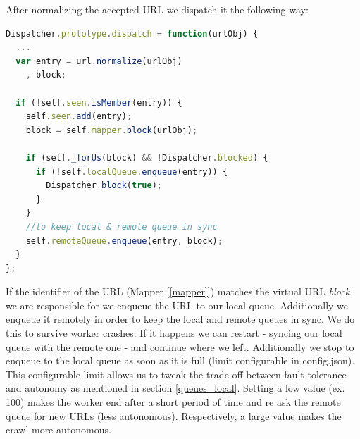 After normalizing the accepted URL we dispatch it the following way:

\begin{lstlisting}[language=JavaScript]
Dispatcher.prototype.dispatch = function(urlObj) {
  ...
  var entry = url.normalize(urlObj)
    , block;
  
  if (!self.seen.isMember(entry)) {
    self.seen.add(entry);
    block = self.mapper.block(urlObj);
  
    if (self._forUs(block) && !Dispatcher.blocked) {
      if (!self.localQueue.enqueue(entry)) {
        Dispatcher.block(true);
      }                                                                                                                                
    }
    //to keep local & remote queue in sync
    self.remoteQueue.enqueue(entry, block);
  }
};
\end{lstlisting}

If the identifier of the URL (Mapper [\ref{mapper}]) matches the virtual URL \emph{block} we are responsible for we enqueue the URL to our local queue. Additionally we enqueue it remotely in order to keep the local and remote queues in sync. We do this to survive worker crashes. If it happens we can restart - syncing our local queue with the remote one - and continue where we left. Additionally we stop to enqueue to the local queue as soon as it is full (limit configurable in config.json). This configurable limit allows us to tweak the trade-off between fault tolerance and autonomy as mentioned in section \ref{queues_local}. Setting a low value (ex. 100) makes the worker end after a short period of time and re ask the remote queue for new URLs (less autonomous). Respectively, a large value makes the crawl more autonomous.

